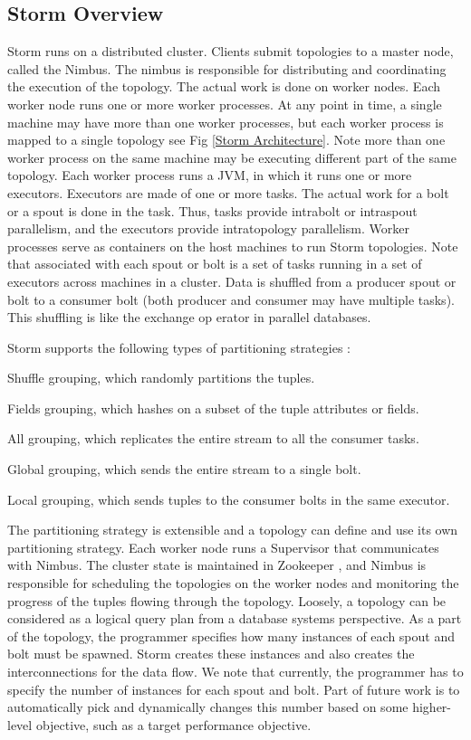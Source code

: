 \documentclass[9pt,twocolumn,twoside]{../../styles/osajnl}
\begin{document}
\subsection{Storm Overview}
Storm runs on a distributed cluster. Clients submit topologies to a
master node, called the Nimbus. The nimbus is responsible for
distributing and coordinating the execution of the topology. The
actual work is done on worker nodes. Each worker node runs one or more
worker processes. At any point in time, a single machine may have more
than one worker processes, but each worker process is mapped to a
single topology see Fig \ref{Storm Architecture}. Note more than one
worker process on the same machine may be executing different part of
the same topology. Each worker process runs a JVM, in which it runs
one or more executors.  Executors are made of one or more tasks. The
actual work for a bolt or a spout is done in the task. Thus, tasks
provide intrabolt or intraspout parallelism, and the executors provide
intratopology parallelism. Worker processes serve as containers on the
host machines to run Storm topologies. Note that associated with each
spout or bolt is a set of tasks running in a set of executors across
machines in a cluster. Data is shuffled from a producer spout or bolt
to a consumer bolt (both producer and consumer may have multiple
tasks). This shuffling is like the exchange op erator in parallel
databases.

Storm supports the following types of partitioning strategies \cite{storm}:
\begin{description}  
\item Shuffle grouping, which randomly partitions the tuples.
\item Fields grouping, which hashes on a subset of the tuple
  attributes or fields.
\item All grouping, which replicates the entire stream to all the
  consumer tasks.
\item Global grouping, which sends the entire stream to a single bolt.
\item Local grouping, which sends tuples to the consumer bolts in the
  same executor.
\end{description}

The partitioning strategy is extensible and a topology can define and
use its own partitioning strategy.  Each worker node runs a Supervisor
that communicates with Nimbus.  The cluster state is maintained in
Zookeeper \cite{www-zookeeper}, and Nimbus is responsible for scheduling
the topologies on the worker nodes and monitoring the progress of the
tuples flowing through the topology. Loosely, a topology can be
considered as a logical query plan from a database systems
perspective. As a part of the topology, the programmer specifies how
many instances of each spout and bolt must be spawned. Storm creates
these instances and also creates the interconnections for the data
flow. We note that currently, the programmer has to specify the number
of instances for each spout and bolt. Part of future work is to
automatically pick and dynamically changes this number based on some
higher-level objective, such as a target performance objective.
\end{document}
